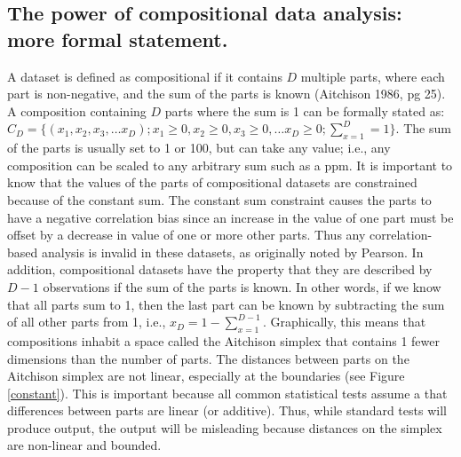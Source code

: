 \documentclass[11pt]{article}\usepackage[]{graphicx}\usepackage[]{color}
\begin{document}
\subsection{The power of compositional data analysis: more formal statement.}
A dataset is defined as compositional if it contains $D$ multiple parts, where each part is non-negative, and the sum of the parts is known (Aitchison 1986, pg 25). A composition containing $D$ parts where the sum is 1 can be formally stated as: $C_D = \{(x_1,x_2,x_3, \ldots x_D); x_1\ge 0, x_2\ge 0, x_3 \ge 0, \ldots x_D \ge 0; \sum_{x=1}^{D} = 1\}$. The sum of the parts is usually set to 1 or 100, but can take any value; i.e., any composition can be scaled to any arbitrary sum such as a ppm.  It is important to know that the values of the parts of compositional datasets are constrained because of the constant sum. The constant sum constraint causes the parts to have a negative correlation bias since an increase in the value of one part must be offset by a decrease in value of one or more other parts. Thus any correlation-based analysis is invalid in these datasets, as originally noted by Pearson\cite{Pearson:1896}. In addition, compositional datasets have the property that they are described by $D-1$ observations if the sum of the parts is known\cite{Aitchison:1986}. In other words, if we know that all parts sum to 1, then the last part can be known by subtracting the sum of all other parts from 1, i.e., $x_D = 1-\sum_{x=1}^{D-1}$. Graphically, this means that compositions inhabit a space called the Aitchison simplex that contains 1 fewer dimensions than the number of parts. The distances between parts on the Aitchison simplex are not linear, especially at the boundaries (see Figure \ref{constant}). This is important because all common statistical tests assume a that differences between parts are linear (or additive). Thus, while standard tests will produce output, the output will be misleading because distances on the simplex are non-linear and bounded. 

%
%
\end{document}
